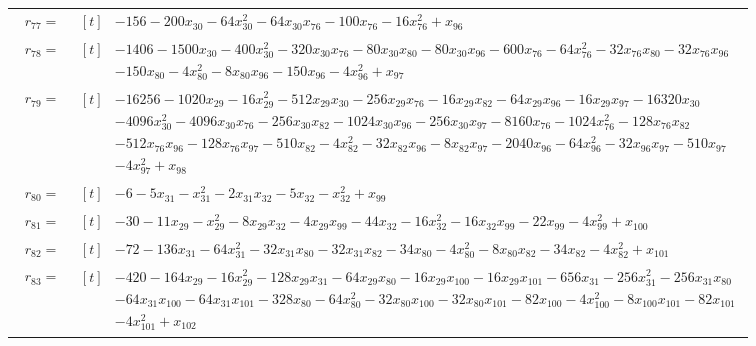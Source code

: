 \begin{longtable}{@{}r p{0.92\linewidth}@{}}
$r_{77}=$ & $\begin{aligned}[t]&-156-200x_{30}-64x_{30}^{2}-64x_{30}x_{76}-100x_{76}-16x_{76}^{2}+x_{96}\end{aligned}$ \\[2pt]
$r_{78}=$ & $\begin{aligned}[t]&-1406-1500x_{30}-400x_{30}^{2}-320x_{30}x_{76}-80x_{30}x_{80}-80x_{30}x_{96}-600x_{76}-64x_{76}^{2}-32x_{76}x_{80}-32x_{76}x_{96}\\[-1pt] &-150x_{80}-4x_{80}^{2}-8x_{80}x_{96}-150x_{96}-4x_{96}^{2}+x_{97}\end{aligned}$ \\[2pt]
$r_{79}=$ & $\begin{aligned}[t]&-16256-1020x_{29}-16x_{29}^{2}-512x_{29}x_{30}-256x_{29}x_{76}-16x_{29}x_{82}-64x_{29}x_{96}-16x_{29}x_{97}-16320x_{30}\\[-1pt] &-4096x_{30}^{2}-4096x_{30}x_{76}-256x_{30}x_{82}-1024x_{30}x_{96}-256x_{30}x_{97}-8160x_{76}-1024x_{76}^{2}-128x_{76}x_{82}\\[-1pt] &-512x_{76}x_{96}-128x_{76}x_{97}-510x_{82}-4x_{82}^{2}-32x_{82}x_{96}-8x_{82}x_{97}-2040x_{96}-64x_{96}^{2}-32x_{96}x_{97}-510x_{97}\\[-1pt] &-4x_{97}^{2}+x_{98}\end{aligned}$ \\[2pt]
$r_{80}=$ & $\begin{aligned}[t]&-6-5x_{31}-x_{31}^{2}-2x_{31}x_{32}-5x_{32}-x_{32}^{2}+x_{99}\end{aligned}$ \\[2pt]
$r_{81}=$ & $\begin{aligned}[t]&-30-11x_{29}-x_{29}^{2}-8x_{29}x_{32}-4x_{29}x_{99}-44x_{32}-16x_{32}^{2}-16x_{32}x_{99}-22x_{99}-4x_{99}^{2}+x_{100}\end{aligned}$ \\[2pt]
$r_{82}=$ & $\begin{aligned}[t]&-72-136x_{31}-64x_{31}^{2}-32x_{31}x_{80}-32x_{31}x_{82}-34x_{80}-4x_{80}^{2}-8x_{80}x_{82}-34x_{82}-4x_{82}^{2}+x_{101}\end{aligned}$ \\[2pt]
$r_{83}=$ & $\begin{aligned}[t]&-420-164x_{29}-16x_{29}^{2}-128x_{29}x_{31}-64x_{29}x_{80}-16x_{29}x_{100}-16x_{29}x_{101}-656x_{31}-256x_{31}^{2}-256x_{31}x_{80}\\[-1pt] &-64x_{31}x_{100}-64x_{31}x_{101}-328x_{80}-64x_{80}^{2}-32x_{80}x_{100}-32x_{80}x_{101}-82x_{100}-4x_{100}^{2}-8x_{100}x_{101}-82x_{101}\\[-1pt] &-4x_{101}^{2}+x_{102}\end{aligned}$ \\[2pt]

\end{longtable}
